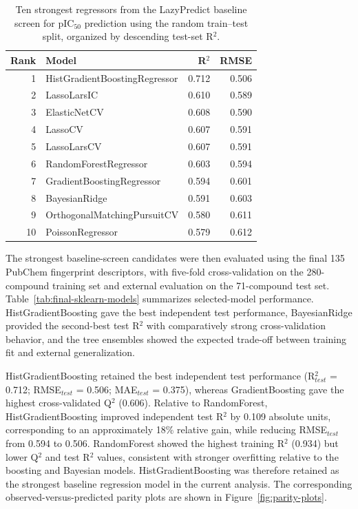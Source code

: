 \documentclass[11pt]{article}
\begin{document}
\begin{table}[htbp]
\centering
\scriptsize
\setlength{\tabcolsep}{4pt}
\caption[LazyPredict baseline regressor screen]{Ten strongest regressors from the LazyPredict baseline screen for pIC$_{50}$ prediction using the random train--test split, organized by descending test-set R$^2$.}
\label{tab:lazypredict-regression}
\begin{tabular}{rlrr}
\hline
Rank & Model & R$^2$ & RMSE \\
\hline
1 & HistGradientBoostingRegressor & 0.712 & 0.506 \\
2 & LassoLarsIC & 0.610 & 0.589 \\
3 & ElasticNetCV & 0.608 & 0.590 \\
4 & LassoCV & 0.607 & 0.591 \\
5 & LassoLarsCV & 0.607 & 0.591 \\
6 & RandomForestRegressor & 0.603 & 0.594 \\
7 & GradientBoostingRegressor & 0.594 & 0.601 \\
8 & BayesianRidge & 0.591 & 0.603 \\
9 & OrthogonalMatchingPursuitCV & 0.580 & 0.611 \\
10 & PoissonRegressor & 0.579 & 0.612 \\
\hline
\end{tabular}
\end{table}

The strongest baseline-screen candidates were then evaluated using the final 135 PubChem fingerprint descriptors, with five-fold cross-validation on the 280-compound training set and external evaluation on the 71-compound test set. Table~\ref{tab:final-sklearn-models} summarizes selected-model performance. HistGradientBoosting gave the best independent test performance, BayesianRidge provided the second-best test R$^2$ with comparatively strong cross-validation behavior, and the tree ensembles showed the expected trade-off between training fit and external generalization.

HistGradientBoosting retained the best independent test performance (R$^2_{test}$ = 0.712; RMSE$_{test}$ = 0.506; MAE$_{test}$ = 0.375), whereas GradientBoosting gave the highest cross-validated Q$^2$ (0.606). Relative to RandomForest, HistGradientBoosting improved independent test R$^2$ by 0.109 absolute units, corresponding to an approximately 18\% relative gain, while reducing RMSE$_{test}$ from 0.594 to 0.506. RandomForest showed the highest training R$^2$ (0.934) but lower Q$^2$ and test R$^2$ values, consistent with stronger overfitting relative to the boosting and Bayesian models. HistGradientBoosting was therefore retained as the strongest baseline regression model in the current analysis. The corresponding observed-versus-predicted parity plots are shown in Figure~\ref{fig:parity-plots}.
\end{document}

